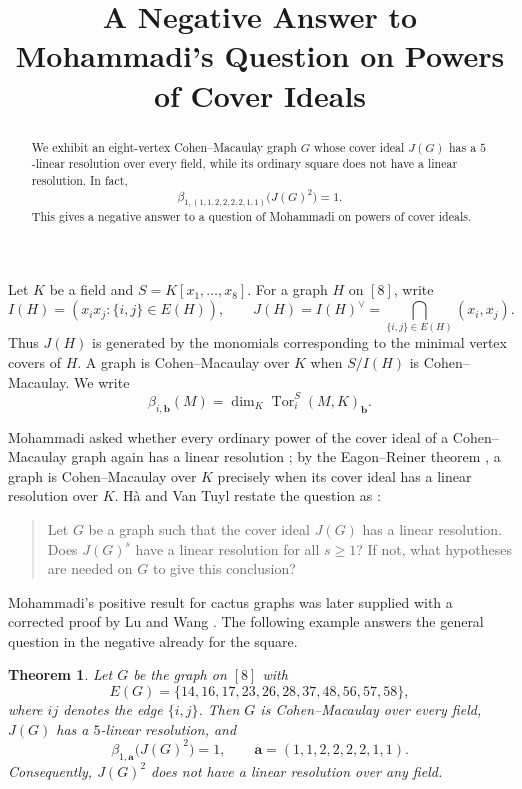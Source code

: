 \documentclass[11pt]{amsart}
\title[A nonlinear square of a cover ideal]
  {A Negative Answer to Mohammadi's Question on Powers of Cover Ideals}
\date{}
\newtheorem{theorem}{Theorem}
\theoremstyle{remark}
\begin{document}
\begin{abstract}
We exhibit an eight-vertex Cohen--Macaulay graph $G$ whose cover
ideal $J(G)$ has a $5$-linear resolution over every field, while its
ordinary square does not have a linear resolution.  In fact,
\[
\beta_{1,(1,1,2,2,2,2,1,1)}\bigl(J(G)^2\bigr)=1.
\]
This gives a negative answer to a question of Mohammadi on powers of
cover ideals.
\end{abstract}

\maketitle

Let $K$ be a field and $S=K[x_1,\ldots,x_8]$.  For a graph $H$ on
$[8]$, write
\[
I(H)=(x_ix_j:\{i,j\}\in E(H)),
\qquad
J(H)=I(H)^\vee
    =\bigcap_{\{i,j\}\in E(H)}(x_i,x_j).
\]
Thus $J(H)$ is generated by the monomials corresponding to the minimal
vertex covers of $H$.  A graph is Cohen--Macaulay over $K$ when
$S/I(H)$ is Cohen--Macaulay.  We write
\[
\beta_{i,\mathbf b}(M)
  =\dim_K\operatorname{Tor}_i^S(M,K)_{\mathbf b}.
\]

Mohammadi asked whether every ordinary power of the cover ideal of a
Cohen--Macaulay graph again has a linear resolution
\cite[Question~4.1]{Mohammadi}; by the Eagon--Reiner theorem
\cite{EagonReiner}, a graph is Cohen--Macaulay over $K$ precisely when
its cover ideal has a linear resolution over $K$.  H\`a and Van Tuyl
restate the question as \cite[Question~6.2]{HaVanTuyl}:
\begin{quote}
Let $G$ be a graph such that the cover ideal $J(G)$ has a linear
resolution.  Does $J(G)^s$ have a linear resolution for all $s\geq1$?
If not, what hypotheses are needed on $G$ to give this conclusion?
\end{quote}
Mohammadi's positive result
for cactus graphs was later supplied with a corrected proof by Lu and
Wang \cite{LuWang}.  The following example answers the general
question in the negative already for the square.

\begin{theorem}\label{thm:main}
Let $G$ be the graph on $[8]$ with
\[
E(G)=\{14,16,17,23,26,28,37,48,56,57,58\},
\]
where $ij$ denotes the edge $\{i,j\}$.  Then $G$ is Cohen--Macaulay
over every field, $J(G)$ has a $5$-linear resolution, and
\[
\beta_{1,\mathbf a}\bigl(J(G)^2\bigr)=1,
\qquad
\mathbf a=(1,1,2,2,2,2,1,1).
\]
Consequently, $J(G)^2$ does not have a linear resolution over any
field.
\end{theorem}
\end{document}

